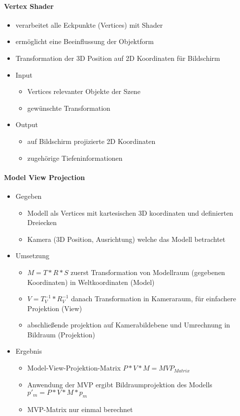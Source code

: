 \documentclass[10pt,landscape]{article}
\begin{document}
\begin{multicols}{3}
\paragraph{Vertex Shader}
\begin{itemize}
  \item verarbeitet alle Eckpunkte (Vertices) mit Shader
  \item ermöglicht eine Beeinflussung der Objektform
  \item Transformation der 3D Position auf 2D Koordinaten für Bildschirm
  \item Input
  \begin{itemize}
    \item Vertices relevanter Objekte der Szene
    \item gewünschte Transformation
  \end{itemize}
  \item Output
  \begin{itemize}
    \item auf Bildschirm projizierte 2D Koordinaten
    \item zugehörige Tiefeninformationen
  \end{itemize}
\end{itemize}

\paragraph{Model View Projection}
\begin{itemize}
  \item Gegeben
  \begin{itemize}
    \item Modell als Vertices mit kartesischen 3D koordinaten und definierten Dreiecken
    \item Kamera (3D Position, Ausrichtung) welche das Modell betrachtet
  \end{itemize}
  \item Umsetzung
  \begin{itemize}
    \item $M=T*R*S$ zuerst Transformation von Modellraum (gegebenen Koordinaten) in Weltkoordinaten (Model)
    \item $V=T_V^{-1}*R_V^{-1}$ danach Transformation in Kameraraum, für einfachere Projektion (View)
    \item abschließende projektion auf Kamerabildebene und Umrechnung in Bildraum (Projektion)
  \end{itemize}
  \item Ergebnis
  \begin{itemize}
    \item Model-View-Projektion-Matrix $P*V*M=MVP_{Matrix}$
    \item Anwendung der MVP ergibt Bildraumprojektion des Modells $p'_m=P*V*M*p_m$
    \item MVP-Matrix nur einmal berechnet
  \end{itemize}
\end{itemize}


\end{multicols}
\end{document}

